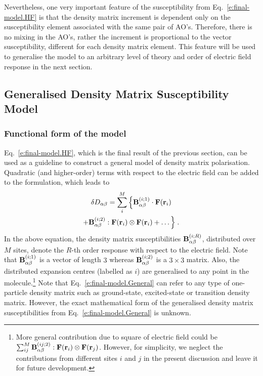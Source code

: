 \documentclass[aip,amsmath,amssymb,reprint,floatfix]{revtex4-1}
\begin{document}
Nevertheless, one very important feature of the susceptibility from Eq.~\eqref{e:final-model.HF} is that
the density matrix increment is dependent only on the susceptibility element associated with the same
pair of AO's. Therefore, there is no mixing in the AO's, rather the increment is proportional to the 
vector susceptibility, different for each density matrix element. This feature will be used to
generalise the model to an arbitrary level of theory and order of electric field response in the next section.


\subsection{Generalised Density Matrix Susceptibility Model}

\subsubsection{Functional form of the model}

Eq.~\eqref{e:final-model.HF}, which is the final result of the previous section, 
can be used as a guideline to construct a general model of density matrix polarisation.
Quadratic (and higher\hyp{}order) terms with respect to the electric field
can be added to the formulation, which leads to
%
\begin{multline}\label{e:final-model.General}
 \delta D_{\alpha\beta} = \sum_{i }^M \Big\{
                                      {\bf B}^{(i ; 1)}_{\alpha\beta} \cdot {\bf F}({\bf r}_i)  \\
                        +             {\bf B}^{(i ; 2)}_{\alpha\beta} : {\bf F}({\bf r}_i) \otimes {\bf F}({\bf r}_i) 
                        + \ldots \Big\} \;.
\end{multline}
%
In the above equation, the density matrix susceptibilities
${\bf B}^{(i; R)}_{\alpha\beta}$, distributed over $M$ sites,
denote the $R$-th order response with respect to the electric field.
Note that
${\bf B}^{(i; 1)}_{\alpha\beta}$ is a vector of length $3$ whereas ${\bf B}^{(i; 2)}_{\alpha\beta}$
is a $3\times 3$ matrix. Also, the distributed expansion centres
(labelled as $i$) are generalised to any point in the molecule.\footnote{More general
contribution due to square of electric field could 
be $\sum_{ij}^M {\bf B}^{(ij; 2)}_{\alpha\beta} : {\bf F}({\bf r}_i) \otimes {\bf F}({\bf r}_j)$. 
However, for simplicity, we neglect the contributions from different sites $i$ and $j$
in the present discussion and leave it for future development.
} Note that Eq.~\eqref{e:final-model.General} can refer to any type of one\hyp{}particle density matrix
such as ground\hyp{}state, excited\hyp{}state or transition density matrix.
However, the exact mathematical form of the generalised density matrix susceptibilities 
from Eq.~\eqref{e:final-model.General} is unknown. 
\end{document}
